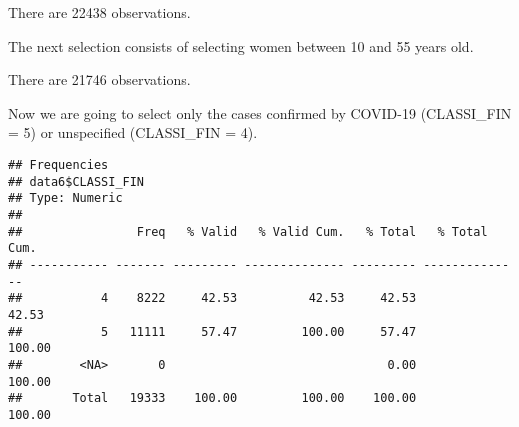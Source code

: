 \documentclass[
]{article}
\newenvironment{Shaded}{\begin{snugshade}}{\end{snugshade}}
\newcommand{\CommentTok}[1]{\textcolor[rgb]{0.56,0.35,0.01}{\textit{#1}}}
\newcommand{\DecValTok}[1]{\textcolor[rgb]{0.00,0.00,0.81}{#1}}
\newcommand{\KeywordTok}[1]{\textcolor[rgb]{0.13,0.29,0.53}{\textbf{#1}}}
\newcommand{\NormalTok}[1]{#1}
\newcommand{\OperatorTok}[1]{\textcolor[rgb]{0.81,0.36,0.00}{\textbf{#1}}}
\newcommand{\StringTok}[1]{\textcolor[rgb]{0.31,0.60,0.02}{#1}}
\begin{document}
There are 22438 observations.

The next selection consists of selecting women between 10 and 55 years
old.

\begin{Shaded}
\end{Shaded}

There are 21746 observations.

Now we are going to select only the cases confirmed by COVID-19
(CLASSI\_FIN = 5) or unspecified (CLASSI\_FIN = 4).

\begin{Shaded}
\end{Shaded}

\begin{Shaded}
\end{Shaded}

\begin{verbatim}
## Frequencies  
## data6$CLASSI_FIN  
## Type: Numeric  
## 
##                Freq   % Valid   % Valid Cum.   % Total   % Total Cum.
## ----------- ------- --------- -------------- --------- --------------
##           4    8222     42.53          42.53     42.53          42.53
##           5   11111     57.47         100.00     57.47         100.00
##        <NA>       0                               0.00         100.00
##       Total   19333    100.00         100.00    100.00         100.00
\end{verbatim}
\end{document}
